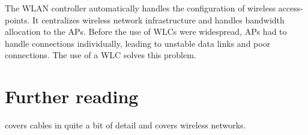 The \acs{WLAN} controller automatically handles the configuration of wireless access-points.
It centralizes wireless network infrastructure and handles bandwidth allocation to the \aclp{AP}.
Before the use of \acsp{WLC} were widespread, \aclp{AP} had to handle connections individually, leading to unstable data links and poor connections.
The use of a \acs{WLC} solves this problem.

\section{Further reading}
\textcite{oliviero} covers cables in quite a bit of detail and \textcite{coleman} covers wireless networks.
